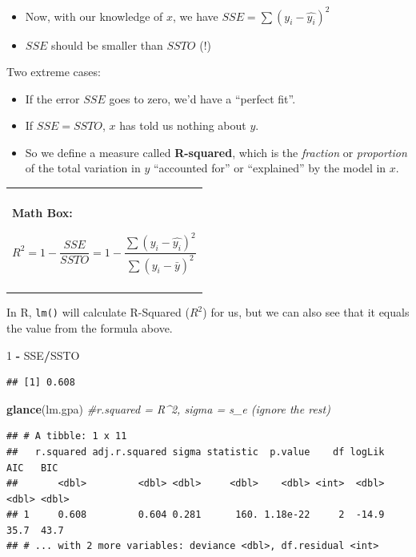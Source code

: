 \documentclass[]{book}
\newenvironment{Shaded}{\begin{snugshade}}{\end{snugshade}}
\newcommand{\CommentTok}[1]{\textcolor[rgb]{0.56,0.35,0.01}{\textit{#1}}}
\newcommand{\DecValTok}[1]{\textcolor[rgb]{0.00,0.00,0.81}{#1}}
\newcommand{\KeywordTok}[1]{\textcolor[rgb]{0.13,0.29,0.53}{\textbf{#1}}}
\newcommand{\NormalTok}[1]{#1}
\newcommand{\OperatorTok}[1]{\textcolor[rgb]{0.81,0.36,0.00}{\textbf{#1}}}
\newcommand{\StringTok}[1]{\textcolor[rgb]{0.31,0.60,0.02}{#1}}
\newenvironment{mathbox}
{
    \begin{center}
    
    \begin{tabular}{|p{0.8\textwidth}|}
    \rowcolor{LightYellow}
    \hline\\
    \rowcolor{LightYellow}
    \textbf{Math Box:}
}
{
    \\\rowcolor{LightYellow}
    \\\hline
    \end{tabular} 
    \end{center}
}
\begin{document}
\begin{itemize}
\item
  Now, with our knowledge of \(x\), we have \(SSE = \sum{(y_i - \hat{y_i})^2}\)
\item
  \(SSE\) should be smaller than \(SSTO\) (!)
\end{itemize}

Two extreme cases:

\begin{itemize}
\item
  If the error \(SSE\) goes to zero, we'd have a ``perfect fit''.
\item
  If \(SSE = SSTO\), \(x\) has told us nothing about \(y\).
\item
  So we define a measure called \textbf{R-squared}, which is the \emph{fraction} or \emph{proportion} of the total variation in \(y\) ``accounted for'' or ``explained'' by the model in \(x\).
\end{itemize}

\begin{mathbox}
\[ R^2 = 1 - \frac{SSE}{SSTO} = 1 - \frac{ \sum{(y_i - \hat{y_i})^2}}{ \sum{(y_i - \bar{y})^2}}\]
\end{mathbox}

In R, \texttt{lm()} will calculate R-Squared (\(R^2\)) for us, but we can also see that it equals the value from the formula above.

\begin{Shaded}
\begin{Highlighting}[]
\DecValTok{1} \OperatorTok{-}\StringTok{ }\NormalTok{SSE}\OperatorTok{/}\NormalTok{SSTO}
\end{Highlighting}
\end{Shaded}

\begin{verbatim}
## [1] 0.608
\end{verbatim}

\begin{Shaded}
\begin{Highlighting}[]
\KeywordTok{glance}\NormalTok{(lm.gpa) }\CommentTok{#r.squared = R^2, sigma = s_e (ignore the rest)}
\end{Highlighting}
\end{Shaded}

\begin{verbatim}
## # A tibble: 1 x 11
##   r.squared adj.r.squared sigma statistic  p.value    df logLik   AIC   BIC
##       <dbl>         <dbl> <dbl>     <dbl>    <dbl> <int>  <dbl> <dbl> <dbl>
## 1     0.608         0.604 0.281      160. 1.18e-22     2  -14.9  35.7  43.7
## # ... with 2 more variables: deviance <dbl>, df.residual <int>
\end{verbatim}
\end{document}

